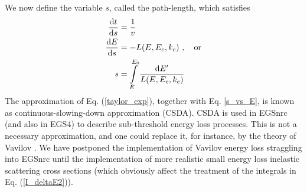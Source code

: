 We now define the variable $s$, called the path-length,
which satisfies
\begin{equation}
\label{s_vs_E}
\begin{split}
{{\rm d} t \over {\rm d} s} & = \frac{1}{v} \\
{{\rm d} E \over {\rm d} s} & = -L(E,E_c,k_c)~, \quad \text{or} \\
 s & = \int\limits_E^{E_0} {{\rm d} E' \over L(E,E_c,k_c)}
\end{split}
\end{equation}
The approximation of Eq. (\ref{taylor_exp}), together
with Eq. \eqref{s_vs_E}, is known
as continuous-slowing-down approximation (CSDA). CSDA is used
in EGSnrc (and also in EGS4) to describe sub-threshold
energy loss processes. This is not a necessary
approximation, and one could replace it, for instance, by
the theory of Vavilov \cite{Va57}. We have postponed
the implementation of Vavilov energy loss straggling
into EGSnrc until the implementation of more realistic
small energy loss inelastic scattering cross sections
(which obviously affect the treatment of the integrals in
Eq. (\ref{I_deltaE2})).

